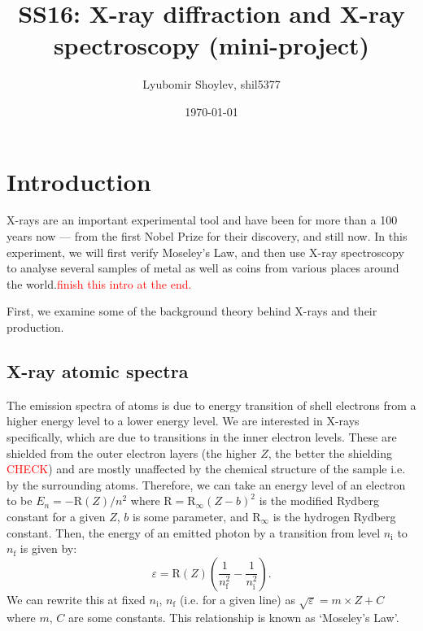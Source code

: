 \documentclass[11pt,a4paper,twoside,onecolumn]{article}
\title{\textbf{SS16: X-ray diffraction and X-ray spectroscopy (mini-project)}}
\author{Lyubomir Shoylev, shil5377}
\date{\today}
\newcommand{\reminder}[1]{\textcolor{red}{#1}}
\newcommand{\rydberg}{\mathrm{R}}
\begin{document}
\maketitle

\begin{abstract}
    \lipsum
\end{abstract}

\section{Introduction}

X-rays are an important experimental tool and have been for more than a 100 years now --- from the first Nobel Prize for their discovery, and still now. In this experiment, we will first verify Moseley's Law, and then use X-ray spectroscopy to analyse several samples of metal as well as coins from various places around the world.\reminder{finish this intro at the end.} %

First, we examine some of the background theory behind X-rays and their production.

\subsection{X-ray atomic spectra}
The emission spectra of atoms is due to energy transition of shell electrons from a higher energy level to a lower energy level. We are interested in X-rays specifically, which are due to transitions in the inner electron levels. These are shielded from the outer electron layers (the higher $Z$, the better the shielding \reminder{CHECK}) and are mostly unaffected by the chemical structure of the sample i.e. by the surrounding atoms. Therefore, we can take an energy level of an electron to be $E_n = -\rydberg\left(Z\right) / n^2$ where $\rydberg = \rydberg_\infty \left(Z - b\right)^2$ is the modified Rydberg constant for a given $Z$, $b$ is some parameter, and $\rydberg_\infty$ is the hydrogen Rydberg constant. Then, the energy of an emitted photon by a transition from level $n_\mathrm{i}$ to $n_\mathrm{f}$ is given by:
\begin{equation}\label{eqn:x-ray-energy}
    \varepsilon = \rydberg\left(Z\right) \left(\frac{1}{n_\mathrm{f}^2} - \frac{1}{n_\mathrm{i}^2}\right).
\end{equation}
We can rewrite this at fixed $n_\mathrm{i}$, $n_\mathrm{f}$ (i.e. for a given line) as $\sqrt{\varepsilon} = m \times Z + C$ where $m$, $C$ are some constants. This relationship is known as `Moseley's Law'.
\end{document}
